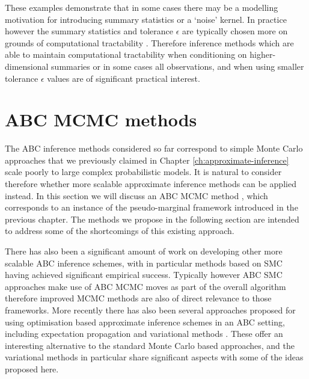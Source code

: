 These examples demonstrate that in some cases there may be a modelling motivation for introducing summary statistics or a `noise' kernel. In practice however the summary statistics and tolerance $\epsilon$ are typically chosen more on grounds of computational tractability \citep{marin2012approximate,robert2010model,prangle2015summary}. Therefore inference methods which are able to maintain computational tractability when conditioning on higher-dimensional summaries or in some cases all observations, and when using smaller tolerance $\epsilon$ values are of significant practical interest.


\section{ABC MCMC methods}

The \ac{ABC} inference methods considered so far correspond to simple Monte Carlo approaches that we previously claimed in Chapter \ref{ch:approximate-inference} scale poorly to large complex probabilistic models. It is natural to consider therefore whether more scalable approximate inference methods can be applied instead. In this section we will discuss an \ac{ABC} \ac{MCMC} method \citep{marjoram2003markov,sisson2011likelihood}, which corresponds to an instance of the pseudo-marginal framework introduced in the previous chapter. The methods we propose in the following section are intended to address some of the shortcomings of this existing approach. 

There has also been a significant amount of work on developing other more scalable \ac{ABC} inference schemes, with in particular methods based on \ac{SMC} \citep{sisson2007sequential,toni2009approximate,beaumont2009adaptive,del2012adaptive} having achieved significant empirical success. %
Typically however \ac{ABC} \ac{SMC} approaches make use of \ac{ABC} \ac{MCMC} moves as part of the overall algorithm therefore improved \ac{MCMC} methods are also of direct relevance to those frameworks. More recently there has also been several approaches proposed for using optimisation based approximate inference schemes in an \ac{ABC} setting, including  expectation propagation \citep{barthelme2014expectation} and variational methods \citep{tran2017variational,moreno2016automatic}. These offer an interesting alternative to the standard Monte Carlo based approaches, and the variational methods in particular share significant aspects with some of the ideas proposed here. %

